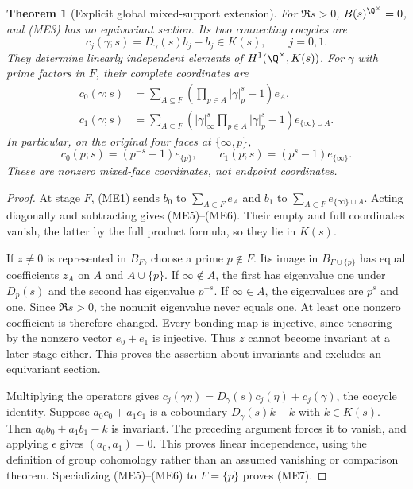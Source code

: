 \documentclass[11pt,a4paper]{article}
\newtheorem{theorem}{Theorem}[section]
\theoremstyle{definition}\newtheorem{definition}[theorem]{Definition}
\begin{document}
\begin{theorem}[Explicit global mixed-support extension]
\label{thm:ME-extension}
For $\Re s>0$, $B(s)^{\Q^\times}=0$, and (ME3) has no equivariant
section. Its two connecting cocycles are
\[
 c_j(\gamma;s)=D_\gamma(s)b_j-b_j\in K(s),\qquad j=0,1.
 \tag{ME4}
\]
They determine linearly independent elements of
$H^1(\Q^\times,K(s))$. For $\gamma$ with prime factors in $F$, their
complete coordinates are
\begin{align}
 c_0(\gamma;s)&=
 \sum_{A\subseteq F}
 \left(\prod_{p\in A}|\gamma|_p^s-1\right)e_A,\tag{ME5}\\
 c_1(\gamma;s)&=
 \sum_{A\subseteq F}
 \left(|\gamma|_\infty^s\prod_{p\in A}|\gamma|_p^s-1\right)
 e_{\{\infty\}\cup A}.\tag{ME6}
\end{align}
In particular, on the original four faces at $\{\infty,p\}$,
\[
 c_0(p;s)=(p^{-s}-1)e_{\{p\}},\qquad
 c_1(p;s)=(p^s-1)e_{\{\infty\}}.
 \tag{ME7}\label{eq:ME-local-cocycle}
\]
These are nonzero mixed-face coordinates, not endpoint coordinates.
\end{theorem}
\begin{proof}
At stage $F$, (ME1) sends $b_0$ to $\sum_{A\subset F}e_A$ and
$b_1$ to $\sum_{A\subset F}e_{\{\infty\}\cup A}$. Acting diagonally
and subtracting gives (ME5)--(ME6). Their empty and full coordinates vanish,
the latter by the full product formula, so they lie in $K(s)$.

If $z\ne0$ is represented in $B_F$, choose a prime $p\notin F$.
Its image in $B_{F\cup\{p\}}$ has equal coefficients $z_A$ on $A$
and $A\cup\{p\}$. If $\infty\notin A$, the first has eigenvalue one
under $D_p(s)$ and the second has eigenvalue $p^{-s}$. If
$\infty\in A$, the eigenvalues are $p^s$ and one. Since $\Re s>0$,
the nonunit eigenvalue never equals one. At least one nonzero coefficient
is therefore changed. Every bonding map is injective, since tensoring by
the nonzero vector $e_0+e_1$ is injective. Thus $z$ cannot become invariant
at a later stage either. This proves the assertion about invariants and
excludes an equivariant section.

Multiplying the operators gives
$c_j(\gamma\eta)=D_\gamma(s)c_j(\eta)+c_j(\gamma)$, the cocycle
identity. Suppose $a_0c_0+a_1c_1$ is a coboundary
$D_\gamma(s)k-k$ with $k\in K(s)$. Then
$a_0b_0+a_1b_1-k$ is invariant. The preceding argument forces it to
vanish, and applying $\epsilon$ gives $(a_0,a_1)=0$.
This proves linear independence, using the definition of group
cohomology rather than an assumed vanishing or comparison theorem.
Specializing (ME5)--(ME6) to $F=\{p\}$ proves (ME7).
\end{proof}
\end{document}
